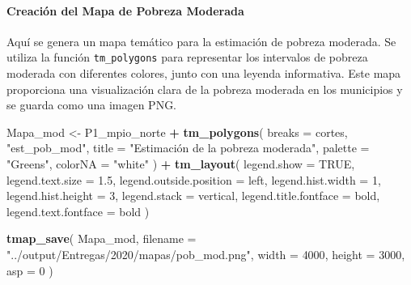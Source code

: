 \documentclass[
  12pt,
]{book}
\newenvironment{Shaded}{\begin{snugshade}}{\end{snugshade}}
\newcommand{\AttributeTok}[1]{\textcolor[rgb]{0.13,0.29,0.53}{#1}}
\newcommand{\ConstantTok}[1]{\textcolor[rgb]{0.56,0.35,0.01}{#1}}
\newcommand{\DecValTok}[1]{\textcolor[rgb]{0.00,0.00,0.81}{#1}}
\newcommand{\FloatTok}[1]{\textcolor[rgb]{0.00,0.00,0.81}{#1}}
\newcommand{\FunctionTok}[1]{\textcolor[rgb]{0.13,0.29,0.53}{\textbf{#1}}}
\newcommand{\NormalTok}[1]{#1}
\newcommand{\OtherTok}[1]{\textcolor[rgb]{0.56,0.35,0.01}{#1}}
\newcommand{\SpecialCharTok}[1]{\textcolor[rgb]{0.81,0.36,0.00}{\textbf{#1}}}
\newcommand{\StringTok}[1]{\textcolor[rgb]{0.31,0.60,0.02}{#1}}
\begin{document}
\hypertarget{creaciuxf3n-del-mapa-de-pobreza-moderada}{%
\paragraph*{Creación del Mapa de Pobreza Moderada}\label{creaciuxf3n-del-mapa-de-pobreza-moderada}}

Aquí se genera un mapa temático para la estimación de pobreza moderada. Se utiliza la función \texttt{tm\_polygons} para representar los intervalos de pobreza moderada con diferentes colores, junto con una leyenda informativa. Este mapa proporciona una visualización clara de la pobreza moderada en los municipios y se guarda como una imagen PNG.

\begin{Shaded}
\begin{Highlighting}[]
\NormalTok{Mapa\_mod }\OtherTok{\textless{}{-}}
\NormalTok{  P1\_mpio\_norte }\SpecialCharTok{+} \FunctionTok{tm\_polygons}\NormalTok{(}
    \AttributeTok{breaks =}\NormalTok{ cortes,}
    \StringTok{"est\_pob\_mod"}\NormalTok{,}
    \AttributeTok{title =} \StringTok{"Estimación de la pobreza moderada"}\NormalTok{,}
    \AttributeTok{palette =} \StringTok{"Greens"}\NormalTok{,}
    \AttributeTok{colorNA =} \StringTok{"white"}
\NormalTok{  ) }\SpecialCharTok{+} \FunctionTok{tm\_layout}\NormalTok{(}
    \AttributeTok{legend.show =} \ConstantTok{TRUE}\NormalTok{,}
    \AttributeTok{legend.text.size =} \FloatTok{1.5}\NormalTok{,}
    \AttributeTok{legend.outside.position =} \StringTok{\textquotesingle{}left\textquotesingle{}}\NormalTok{,}
    \AttributeTok{legend.hist.width =} \DecValTok{1}\NormalTok{,}
    \AttributeTok{legend.hist.height =} \DecValTok{3}\NormalTok{,}
    \AttributeTok{legend.stack =} \StringTok{\textquotesingle{}vertical\textquotesingle{}}\NormalTok{,}
    \AttributeTok{legend.title.fontface =} \StringTok{\textquotesingle{}bold\textquotesingle{}}\NormalTok{,}
    \AttributeTok{legend.text.fontface =} \StringTok{\textquotesingle{}bold\textquotesingle{}}
\NormalTok{  )}

\FunctionTok{tmap\_save}\NormalTok{(}
\NormalTok{  Mapa\_mod,}
  \AttributeTok{filename =} \StringTok{"../output/Entregas/2020/mapas/pob\_mod.png"}\NormalTok{,}
  \AttributeTok{width =} \DecValTok{4000}\NormalTok{,}
  \AttributeTok{height =} \DecValTok{3000}\NormalTok{,}
  \AttributeTok{asp =} \DecValTok{0}
\NormalTok{)}
\end{Highlighting}
\end{Shaded}
\end{document}
